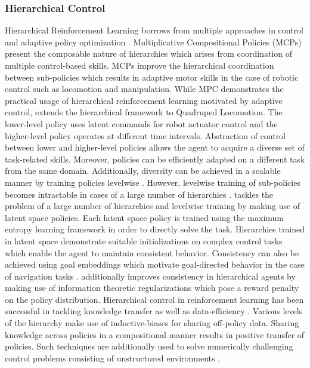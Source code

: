 \documentclass{article}
\begin{document}
\subsubsection{Hierarchical Control}
Hierarchical Reinforcement Learning borrows from multiple approaches in control \cite{control} and adaptive policy optimization \cite{hippo}. Multiplicative Compositional Policies (MCPs) \cite{control} present the composable nature of hierarchies which arises from coordination of multiple control-based skills. MCPs improve the hierarchical coordination between sub-policies which results in adaptive motor skills in the case of robotic control such as locomotion and manipulation. While MPC demonstrates the practical usage of hierarchical reinforcement learning motivated by adaptive control, \cite{quadruped} extends the hierarchical framework to Quadruped Locomotion. The lower-level policy uses latent commands for robot actuator control and the higher-level policy operates at different time intervals. Abstraction of control between lower and higher-level policies allows the agent to acquire a diverse set of task-related skills. Moreover, policies can be efficiently adapted on a different task from the same domain. Additionally, diversity can be achieved in a scalable manner by training policies levelwise \cite{diversity}. However, levelwise training of sub-policies becomes intractable in cases of a large number of hierarchies \cite{lsp}. \cite{lsp} tackles the problem of a large number of hierarchies and levelwise training by making use of latent space policies. Each latent space policy is trained using the maximum entropy learning framework in order to directly solve the task. Hierarchies trained in latent space demonstrate suitable initializations on complex control tasks which enable the agent to maintain consistent behavior. Consistency can also be achieved using goal embeddings which motivate goal-directed behavior in the case of navigation tasks \cite{embedding}. \cite{kl} additionally improves consistency in hierarchical agents by making use of information theoretic regularizations which pose a reward penalty on the policy distribution. Hierarchical control in reinforcement learning has been successful in tackling knowledge transfer as well as data-efficiency \cite{compositional}. Various levels of the hierarchy make use of inductive-biases for sharing off-policy data. Sharing knowledge across policies in a compositional manner results in positive transfer of policies. Such techniques are additionally used to solve numerically challenging control problems consisting of unstructured environments \cite{combinatorial}. 
\end{document}
